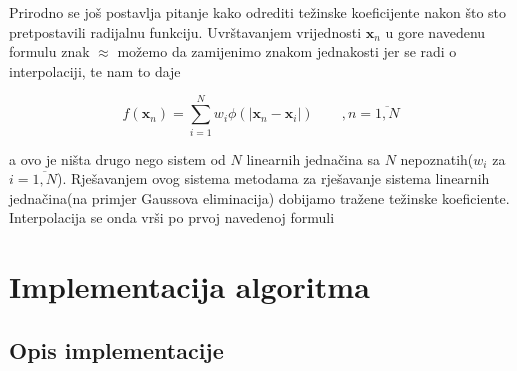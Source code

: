 \documentclass[12pt, a4paper]{report}
\theoremstyle{definition}
\begin{document}
	Prirodno se još postavlja pitanje kako odrediti težinske koeficijente nakon što sto pretpostavili radijalnu funkciju. Uvrštavanjem vrijednosti $\textbf{x}_n$ u gore navedenu formulu znak $\approx$ možemo da zamijenimo znakom jednakosti jer se radi o interpolaciji, te nam to daje
	
	\[f(\textbf{x}_n) = \sum_{i = 1}^{N}w_i \phi(|\textbf{x}_n -\textbf{x}_i|) \qquad ,n = \overline{1,N}\]
	
	a ovo je ništa drugo nego sistem od $N$ linearnih jednačina sa $N$ nepoznatih($w_i$ za $i=\overline{1,N}$). Rješavanjem ovog sistema metodama za rješavanje sistema linearnih jednačina(na primjer Gaussova eliminacija) dobijamo tražene težinske koeficiente. Interpolacija se onda vrši po prvoj navedenoj formuli\\
	
	
	\chapter*{Implementacija algoritma}
	
	\section*{Opis implementacije}	
	
\end{document}
